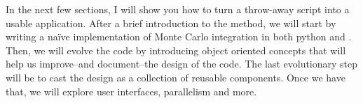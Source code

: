 In the next few sections, I will show you how to turn a throw-away script into a usable
application. After a brief introduction to the method, we will start by writing a na\"ive
implementation of Monte Carlo integration in both python and \cpp. Then, we will evolve the
code by introducing object oriented concepts that will help us improve--and document--the
design of the code. The last evolutionary step will be to cast the design as a collection of
reusable components. Once we have that, we will explore user interfaces, parallelism and more.

